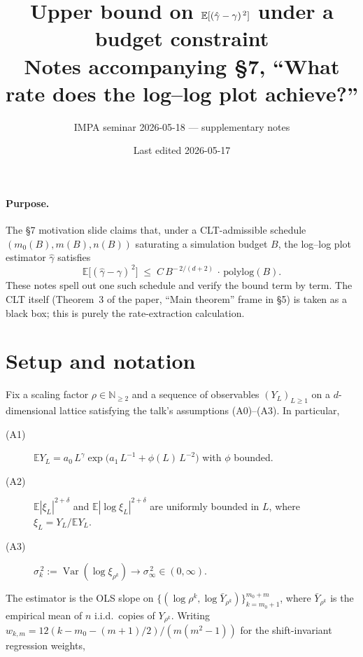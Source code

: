\documentclass[11pt]{article}
\title{Upper bound on $\E[(\hat\gamma-\gamma)^{\,2}]$ under a budget constraint\\[0.3em]
{\large Notes accompanying §7, ``What rate does the log--log plot achieve?''}}
\author{IMPA seminar 2026-05-18 --- supplementary notes}
\date{Last edited 2026-05-17}
\newcommand{\E}{\mathbb{E}}
\newcommand{\Var}{\operatorname{Var}}
\theoremstyle{plain}
\theoremstyle{definition}
\begin{document}
\maketitle

\paragraph{Purpose.}
The §7 motivation slide claims that, under a CLT-admissible schedule
$(m_0(B), m(B), n(B))$ saturating a simulation budget $B$, the
log--log plot estimator $\hat\gamma$ satisfies
\[
  \E\bigl[(\hat\gamma - \gamma)^{\,2}\bigr]
    \;\le\; C\,B^{-\,2/(d+2)}\,\cdot\,\mathrm{polylog}(B).
\]
These notes spell out one such schedule and verify the bound term by
term. The CLT itself (Theorem~3 of the paper, ``Main theorem'' frame
in §5) is taken as a black box; this is purely the rate-extraction
calculation.

\section{Setup and notation}\label{sec:setup}

Fix a scaling factor $\rho \in \mathbb{N}_{\ge 2}$ and a sequence of
observables $(Y_L)_{L\ge 1}$ on a $d$-dimensional lattice satisfying
the talk's assumptions (A0)--(A3). In particular,
\begin{description}
  \item[(A1)] $\E Y_L = a_0\,L^{\gamma}\exp\!\bigl(a_1\,L^{-1} + \phi(L)\,L^{-2}\bigr)$ with $\phi$ bounded.
  \item[(A2)] $\E|\xi_L|^{2+\delta}$ and $\E|\log\xi_L|^{2+\delta}$ are uniformly bounded in $L$, where $\xi_L = Y_L/\E Y_L$.
  \item[(A3)] $\sigma_k^{\,2} := \Var(\log\xi_{\rho^k}) \to \sigma_\infty^{\,2}\in(0,\infty)$.
\end{description}

The estimator is the OLS slope on $\{(\log\rho^{k}, \log\bar Y_{\rho^{k}})\}_{k=m_0+1}^{m_0+m}$,
where $\bar Y_{\rho^k}$ is the empirical mean of $n$ i.i.d.\ copies of
$Y_{\rho^k}$. Writing $w_{k,m} = 12(k-m_0-(m+1)/2)/(m(m^2-1))$ for the
shift-invariant regression weights,
\end{document}

